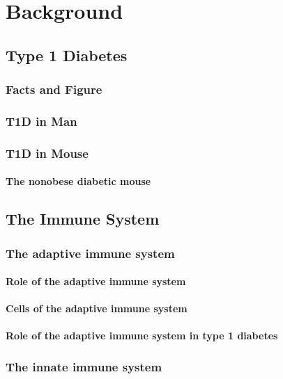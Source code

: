 
\chapter{Background}


\section{Type 1 Diabetes}
\label{sec:sectionLabel}


\subsection{Facts and Figure}
\subsection{T1D in Man}
\subsection{T1D in Mouse}
\subsubsection{The nonobese diabetic mouse}

\section{The Immune System}
\subsection{The adaptive immune system}
\subsubsection{Role of the adaptive immune system}
\subsubsection{Cells of the adaptive immune system}
\subsubsection{Role of the adaptive immune system in type 1 diabetes}
\subsection{The innate immune system}
